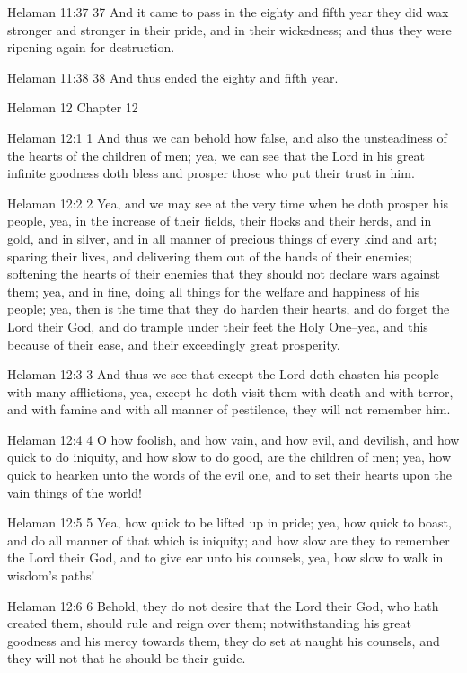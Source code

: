 Helaman 11:37
 37 And it came to pass in the eighty and fifth year they did wax
stronger and stronger in their pride, and in their wickedness;
and thus they were ripening again for destruction.

Helaman 11:38
 38 And thus ended the eighty and fifth year.

Helaman 12
Chapter 12

Helaman 12:1
 1 And thus we can behold how false, and also the unsteadiness of
the hearts of the children of men; yea, we can see that the Lord
in his great infinite goodness doth bless and prosper those who
put their trust in him.

Helaman 12:2
 2 Yea, and we may see at the very time when he doth prosper his
people, yea, in the increase of their fields, their flocks and
their herds, and in gold, and in silver, and in all manner of
precious things of every kind and art; sparing their lives, and
delivering them out of the hands of their enemies; softening the
hearts of their enemies that they should not declare wars against
them; yea, and in fine, doing all things for the welfare and
happiness of his people; yea, then is the time that they do
harden their hearts, and do forget the Lord their God, and do
trample under their feet the Holy One--yea, and this because of
their ease, and their exceedingly great prosperity.

Helaman 12:3
 3 And thus we see that except the Lord doth chasten his people
with many afflictions, yea, except he doth visit them with death
and with terror, and with famine and with all manner of
pestilence, they will not remember him.

Helaman 12:4
 4 O how foolish, and how vain, and how evil, and devilish, and
how quick to do iniquity, and how slow to do good, are the
children of men; yea, how quick to hearken unto the words of the
evil one, and to set their hearts upon the vain things of the
world!

Helaman 12:5
 5 Yea, how quick to be lifted up in pride; yea, how quick to
boast, and do all manner of that which is iniquity; and how slow
are they to remember the Lord their God, and to give ear unto his
counsels, yea, how slow to walk in wisdom's paths!

Helaman 12:6
 6 Behold, they do not desire that the Lord their God, who hath
created them, should rule and reign over them; notwithstanding
his great goodness and his mercy towards them, they do set at
naught his counsels, and they will not that he should be their
guide.

